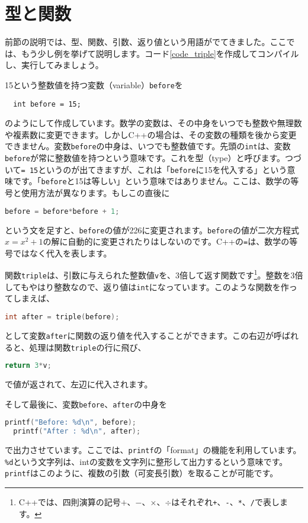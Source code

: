 \section{型と関数}
\label{sec:型と関数}
前節の説明では、型、関数、引数、返り値という用語がでてきました。ここでは、もう少し例を挙げて説明します。コード\ref{code_triple}を作成してコンパイルし、実行してみましょう。

15という整数値を持つ変数（variable）\texttt{before}を
\begin{lstlisting}
  int before = 15; 
\end{lstlisting}
のようにして作成しています。数学の変数は、その中身をいつでも整数や無理数や複素数に変更できます。しかしC++の場合は、その変数の種類を後から変更できません。変数\texttt{before}の中身は、いつでも整数値です。先頭の\texttt{int}は、変数\texttt{before}が常に整数値を持つという意味です。これを型（type）と呼びます。つづいて\texttt{= 15}というのが出てきますが、これは「\texttt{before}に15を代入する」という意味です。「\texttt{before}と15は等しい」という意味ではありません。ここは、数学の等号と使用方法が異なります。もしこの直後に
\begin{lstlisting}[language=c++]
before = before*before + 1;
\end{lstlisting}
という文を足すと、\texttt{before}の値が226に変更されます。\texttt{before}の値が二次方程式$x=x^2+1$の解に自動的に変更されたりはしないのです。C++の\texttt{=}は、数学の等号ではなく代入を表します。

関数\texttt{triple}は、引数に与えられた整数値\texttt{v}を、3倍して返す関数です\footnote{C++では、四則演算の記号$+$、$-$、$\times$、$\div$はそれぞれ\texttt{+}、\texttt{-}、\texttt{*}、\texttt{/}で表します。}。整数を3倍してもやはり整数なので、返り値は\texttt{int}になっています。このような関数を作ってしまえば、
\begin{lstlisting}[language=c++]
  int after = triple(before);
\end{lstlisting}
として変数\texttt{after}に関数の返り値を代入することができます。この右辺が呼ばれると、処理は関数\texttt{triple}の行に飛び、
\begin{lstlisting}[language=c++]
  return 3*v;
\end{lstlisting}
で値が返されて、左辺に代入されます。

そして最後に、変数\texttt{before}、\texttt{after}の中身を
\begin{lstlisting}[language=c++]
  printf("Before: %d\n", before); 
  printf("After : %d\n", after);
\end{lstlisting} 
で出力させています。ここでは、\texttt{printf}の「format」の機能を利用しています。\texttt{\%d}という文字列は、intの変数を文字列に整形して出力するという意味です。\texttt{printf}はこのように、複数の引数（可変長引数）を取ることが可能です。

